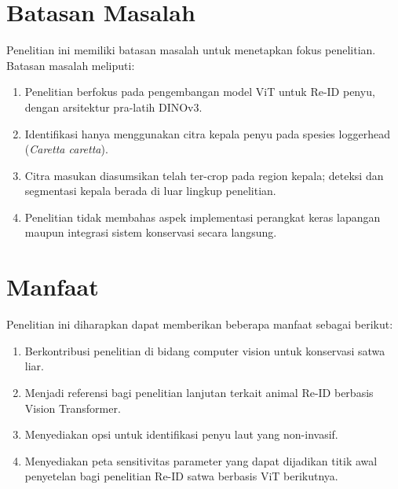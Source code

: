 \section{Batasan Masalah}
Penelitian ini memiliki batasan masalah untuk menetapkan fokus penelitian. Batasan masalah meliputi:
\begin{enumerate}
      \item Penelitian berfokus pada pengembangan model ViT untuk Re-ID penyu, dengan arsitektur pra-latih DINOv3.
      \item Identifikasi hanya menggunakan citra kepala penyu pada spesies loggerhead (\textit{Caretta caretta}).
      \item Citra masukan diasumsikan telah ter-crop pada region kepala; deteksi dan segmentasi kepala berada di luar lingkup penelitian.
      \item Penelitian tidak membahas aspek implementasi perangkat keras lapangan maupun integrasi sistem konservasi secara langsung.
\end{enumerate}

\section{Manfaat}
Penelitian ini diharapkan dapat memberikan beberapa manfaat sebagai berikut:
\begin{enumerate}
      \item Berkontribusi penelitian di bidang computer vision untuk konservasi satwa liar.
      \item Menjadi referensi bagi penelitian lanjutan terkait animal Re-ID berbasis Vision Transformer.
      \item Menyediakan opsi untuk identifikasi penyu laut yang non-invasif.
      \item Menyediakan peta sensitivitas parameter yang dapat dijadikan titik awal penyetelan bagi penelitian Re-ID satwa berbasis ViT berikutnya.
\end{enumerate}
